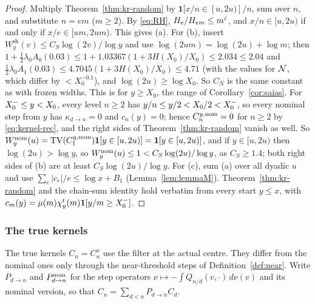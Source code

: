 \begin{proof}
Multiply Theorem~\ref{thm:kr-random} by $\mathbf 1[x/n\in[u,2u)]/n$, sum over $n$, and substitute $n=em$ ($m\ge2$). By
\eqref{eq:RH}, $H_e/H_{em}\le m^\varepsilon$, and $x/n\in[u,2u)$ if and only if $x/e\in[um,2um)$. This gives (a). For (b), insert
$W^{\mathrm{sh}}_y(v)\le C_S\log(2v)/\log y$ and use $\log(2um)=\log(2u)+\log m$; then
$1+\frac12\lambda_0A_0(0.03)\le1+1.03367(1+3H(X_0)/X_0)\le2.034\le2.04$ and
$\frac12\lambda_0A_1(0.03)\le4.7045(1+3H(X_0)/X_0)\le4.71$ (with the values for $\mathcal{N}$, which differ by $<X_0^{-0.1}$),
and $\log(2u)\ge\log X_0$. So $C_N$ is the same constant as with frozen widths. This is for $y\ge X_0$, the range of
Corollary~\ref{cor:saias}. For $X_0^{-}\le y<X_0$, every level $n\ge2$ has $y/n\le y/2<X_0/2<X_0^{-}$, so every nominal step from $y$ has $\kappa_{d\to n}=0$ and $c_n(y)=0$; hence $C^{y,\mathrm{nom}}_n=0$ for $n\ge2$ by \eqref{eq:kernel-rec}, and
the right sides of Theorem~\ref{thm:kr-random} vanish as well. So $W^{\mathrm{nom}}_y(u)=\operatorname{TV}(C_1^{y,\mathrm{nom}})\mathbf 1[y\in[u,2u)]
=\mathbf 1[y\in[u,2u)]$, and if $y\in[u,2u)$ then $\log(2u)>\log y$, so $W^{\mathrm{nom}}_y(u)\le1<C_S\log(2u)/\log y$, as $C_S\ge1.4$; both
right sides of (b) are at least $C_S\log(2u)/\log y$. For (c), sum (a) over all dyadic $u$ and use
$\sum_e|c_e|/e\le\log x+B_1$ (Lemma~\ref{lem:lemmaM}). Theorem~\ref{thm:kr-random} and the chain-sum identity hold verbatim
from every start $y\le x$, with $c_m(y)=\mu(m)\chi^t_y(m)\mathbf 1[y/m\ge X_0^{-}]$.
\end{proof}

\subsubsection{The true kernels}\label{sec:true-kernels}

The true kernels $C_n=C_n^x$ use the filter at the actual centre. They differ from the nominal ones only through the
near-threshold steps of Definition~\ref{def:near}. Write $P_{d\to n}$ and $P^{\mathrm{nom}}_{d\to n}$ for the step operators
$\nu\mapsto-\int Q_{n/d}(v,\cdot)\,d\nu(v)$ and its nominal version, so that $C_n=\sum_{d<n}P_{d\to n}C_d$.

